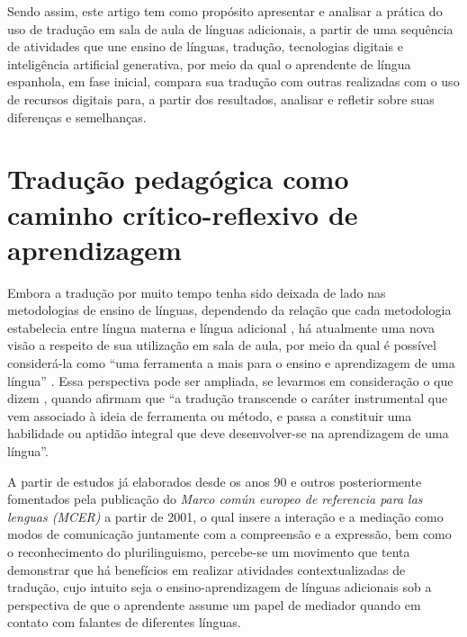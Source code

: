 \documentclass[portuguese]{textolivre}
\begin{document}
Sendo assim, este artigo tem como propósito apresentar e analisar a prática do uso de tradução em sala de aula de línguas adicionais, a partir de uma sequência de atividades que une ensino de línguas, tradução, tecnologias digitais e inteligência artificial generativa, por meio da qual o aprendente de língua espanhola, em fase inicial, compara sua tradução com outras realizadas com o uso de recursos digitais para, a partir dos resultados, analisar e refletir sobre suas diferenças e semelhanças.


\section{Tradução pedagógica como caminho crítico-reflexivo de aprendizagem}\label{sec-2}

Embora a tradução por muito tempo tenha sido deixada de lado nas metodologias de ensino de línguas, dependendo da relação que cada metodologia esta\-belecia entre língua materna e língua adicional \cite{bergmann2024}, há atualmente uma nova visão a respeito de sua utilização em sala de aula, por meio da qual é possível considerá-la como “uma ferramenta a mais para o ensino e aprendizagem de uma língua” \cite[p. 9]{pintado2019}. Essa perspectiva pode ser ampliada, se levarmos em consideração o que dizem \textcite[p. 616, tradução nossa]{carreres2019}, quando afirmam que “a tradução transcende o caráter instrumental que vem associado à ideia de ferramenta ou método, e passa a constituir uma habilidade ou aptidão integral que deve desenvolver-se na aprendizagem de uma língua”.

A partir de estudos já elaborados desde os anos 90 e outros posteriormente fomentados pela publicação do \textit{Marco común europeo de referencia para las lenguas (MCER)} a partir de 2001, o qual insere a interação e a mediação como modos de comunicação juntamente com a compreensão e a expressão, bem como o reconhecimento do plurilinguismo, percebe-se um movimento que tenta demonstrar que há benefícios em realizar atividades contextualizadas de tradução, cujo intuito seja o ensino-aprendizagem de línguas adicionais sob a perspectiva de que o aprendente assume um papel de mediador quando em contato com falantes de diferentes línguas.
\end{document}
